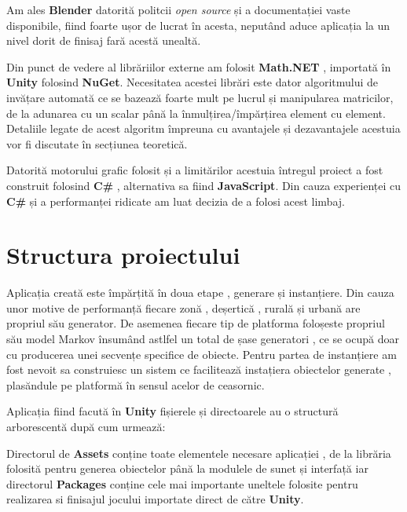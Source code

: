 Am ales \textbf{Blender} datorită politcii \textit{open source} și a documentației vaste disponibile, fiind foarte ușor de lucrat în acesta, neputând aduce aplicația la un nivel dorit de finisaj fară acestă unealtă.\par

Din punct de vedere al librăriilor externe am folosit \textbf{Math.NET} , importată în \textbf{Unity} folosind \textbf{NuGet}. Necesitatea acestei librări este dator algoritmului de invățare automată ce se bazează foarte mult pe lucrul și manipularea matricilor, de la adunarea cu un scalar până la înmulțirea/împărțirea element cu element. Detaliile legate de acest algoritm împreuna cu avantajele și dezavantajele acestuia vor fi discutate în secțiunea teoretică.\par

Datorită motorului grafic folosit și a limitărilor acestuia întregul proiect a fost construit folosind \textbf{C\#} , alternativa sa fiind \textbf{JavaScript}. Din cauza experienței cu \textbf{C\#} și a performanței ridicate am luat decizia de a folosi acest limbaj.\par


\section{Structura proiectului}

Aplicația creată este împărțită în doua etape , generare și instanțiere. Din cauza unor motive de performanță fiecare zonă  , deșertică , rurală și urbană are propriul său generator. De asemenea fiecare tip de platforma foloșeste propriul său model Markov însumând astlfel un total de șase generatori , ce se ocupă doar cu producerea unei secvențe specifice de obiecte. Pentru partea de instanțiere am fost nevoit sa construiesc un sistem ce facilitează instațiera obiectelor generate , plasăndule pe platformă în sensul acelor de ceasornic.\par

Aplicația fiind facută în \textbf{Unity} fișierele și directoarele au o structură arborescentă după cum urmează: \par

\par

Directorul de \textbf{Assets} conține toate elementele necesare aplicației , de la librăria folosită pentru generea obiectelor până la modulele de sunet și interfață iar directorul \textbf{Packages} conține cele mai importante uneltele folosite pentru realizarea si finisajul jocului importate direct de către \textbf{Unity}.\par

